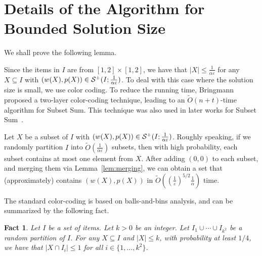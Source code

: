 \documentclass[a4paper,UKenglish,cleveref, autoref, thm-restate, pdfa]{lipics-v2021}
\newcommand{\eps}{\varepsilon}
\renewcommand{\leq}{\leqslant}
\newtheorem{fact}[theorem]{\bfseries{Fact}}
\begin{document}
\section{Details of the Algorithm for Bounded Solution Size}\label{app:color-coding}
We shall prove the following lemma. 

\lemalgforlargealpha*



Since the items in $I$ are from $[1,2]\times [1,2]$, we have that  $|X| \leq \frac{1}{\alpha\eps}$ for any $X \subseteq I$ with $(w(X), p(X)) \in {\cal S}^+(I;\frac{1}{\alpha\eps})$. To deal with this case where the solution size is small, we use color coding. To reduce the running time, Bringmann~\cite{Bri17} proposed a two-layer color-coding technique, leading to an $\tilde{O}(n + t)$-time algorithm for Subset Sum. This technique was also used in later works for Subset Sum~\cite{CLMZ24cSTOCPartition,CLMZ24FOCS}.

Let $X$ be a subset of $I$ with $(w(X), p(X)) \in {\cal S}^+(I;\frac{1}{\alpha\eps})$.  Roughly speaking, if we randomly partition $I$ into $\tilde{O}(\frac{1}{\alpha\eps})$ subsets, then with high probability, each subset contains at most one element from $X$. After adding $(0,0)$ to each subset, and merging them via Lemma~\ref{lem:merging}, we can obtain a set that (approximately) contains $(w(X), p(X))$ in $\tilde{O}((\frac{1}{\eps})^{5/2}\frac{1}{\alpha})$ time. 


The standard color-coding is based on balls-and-bins analysis, and can be summarized by the following fact.
\begin{fact}\label{fact:colorcoding}
    Let $I$ be a set of items. Let $k>0$ be an integer. Let $I_1 \cup \cdots \cup I_{k^2}$ be a random partition of $I$. For any $X\subseteq I$ and $|X|\leq k$, with probability at least $1/4$, we have that
    \(
        | X \cap I_i| \leq 1
    \)
    for all $i \in \{1, \ldots, k^2\}$.
\end{fact}
\end{document}
